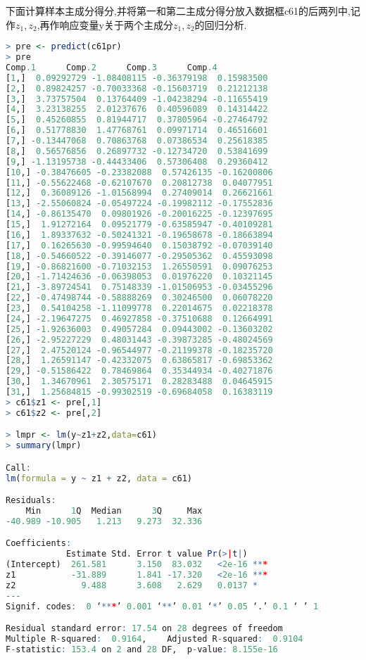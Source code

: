 \documentclass[11pt,a4paper,oneside]{book}
\begin{document}
下面计算样本主成分得分,并将第一和第二主成分得分放入数据框c61的后两列中,记作$ z_1,z_2 $,再作响应变量y关于两个主成分$ z_1,z_2 $的回归分析.
\begin{lstlisting}[language=r]
> pre <- predict(c61pr)
> pre
Comp.1      Comp.2      Comp.3      Comp.4
[1,]  0.09292729 -1.08408115 -0.36379198  0.15983500
[2,]  0.89824257 -0.70033368 -0.15603719  0.21212138
[3,]  3.73757504  0.13764409 -1.04238294 -0.11655419
[4,]  3.23138255  2.01237676  0.40596089  0.14314422
[5,]  0.45260855  0.81944717  0.37805964 -0.27464792
[6,]  0.51778830  1.47768761  0.09971714  0.46516601
[7,] -0.13447068  0.70863768  0.07386534  0.25618385
[8,]  0.56576856  0.26897732 -0.12734720  0.53841699
[9,] -1.13195738 -0.44433406  0.57306408  0.29360412
[10,] -0.38476605 -0.23382088  0.57426135 -0.16200806
[11,] -0.55622468 -0.62107670  0.20812738  0.04077951
[12,]  0.36089126 -1.01568994  0.27409014  0.26621661
[13,] -2.55060824 -0.05497224 -0.19982112 -0.17552836
[14,] -0.86135470  0.09801926 -0.20016225 -0.12397695
[15,]  1.91272164  0.09521779 -0.63585947 -0.40109281
[16,]  1.89337632 -0.50241321 -0.19658678 -0.18663894
[17,]  0.16265630 -0.99594640  0.15038792 -0.07039140
[18,] -0.54660522 -0.39146077 -0.29505362  0.45593098
[19,] -0.86821600 -0.71032153  1.26550591  0.09076253
[20,] -1.71424636 -0.06398053  0.01976220  0.10321145
[21,] -3.89724541  0.75148339 -1.01506953 -0.03455296
[22,] -0.47498744 -0.58888269  0.30246500  0.06078220
[23,]  0.54104258 -1.11099778  0.22014675  0.02218378
[24,] -2.19647275  0.46927858 -0.37510688  0.12664991
[25,] -1.92636003  0.49057284  0.09443002 -0.13603202
[26,] -2.95227229  0.48031443 -0.39873285 -0.48024569
[27,]  2.47520124 -0.96544977 -0.21199378 -0.18235720
[28,]  1.26591147 -0.42332075  0.63865817 -0.69853362
[29,] -0.51586422  0.78469864  0.35344934 -0.40271876
[30,]  1.34670961  2.30575171  0.28283488  0.04645915
[31,]  1.25684815 -0.99302519 -0.69684058  0.16383119
> c61$z1 <- pre[,1]
> c61$z2 <- pre[,2]

> lmpr <- lm(y~z1+z2,data=c61)
> summary(lmpr)

Call:
lm(formula = y ~ z1 + z2, data = c61)

Residuals:
    Min      1Q  Median      3Q     Max
-40.989 -10.905   1.213   9.273  32.336 

Coefficients:
            Estimate Std. Error t value Pr(>|t|)    
(Intercept)  261.581      3.150  83.032   <2e-16 ***
z1           -31.889      1.841 -17.320   <2e-16 ***
z2             9.488      3.608   2.629   0.0137 *  
---
Signif. codes:  0 ‘***’ 0.001 ‘**’ 0.01 ‘*’ 0.05 ‘.’ 0.1 ‘ ’ 1

Residual standard error: 17.54 on 28 degrees of freedom
Multiple R-squared:  0.9164,	Adjusted R-squared:  0.9104 
F-statistic: 153.4 on 2 and 28 DF,  p-value: 8.155e-16
\end{lstlisting}
\end{document}
